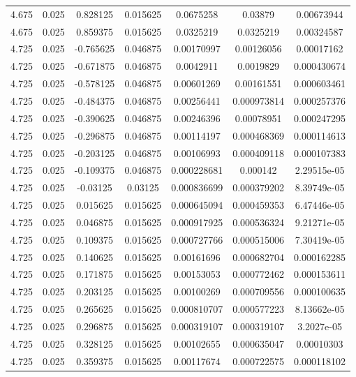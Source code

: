 \begin{table}[bh]
\begin{center}
{\begin{tabular}{ccccccc}
4.675	 & 0.025 & 	0.828125	 & 0.015625	 & 0.0675258	 & 0.03879	 & 0.00673944 \\ 
4.675	 & 0.025 & 	0.859375	 & 0.015625	 & 0.0325219	 & 0.0325219	 & 0.00324587 \\ 
4.725	 & 0.025 & 	-0.765625	 & 0.046875	 & 0.00170997	 & 0.00126056	 & 0.00017162 \\ 
4.725	 & 0.025 & 	-0.671875	 & 0.046875	 & 0.0042911	 & 0.0019829	 & 0.000430674 \\ 
4.725	 & 0.025 & 	-0.578125	 & 0.046875	 & 0.00601269	 & 0.00161551	 & 0.000603461 \\ 
4.725	 & 0.025 & 	-0.484375	 & 0.046875	 & 0.00256441	 & 0.000973814	 & 0.000257376 \\ 
4.725	 & 0.025 & 	-0.390625	 & 0.046875	 & 0.00246396	 & 0.00078951	 & 0.000247295 \\ 
4.725	 & 0.025 & 	-0.296875	 & 0.046875	 & 0.00114197	 & 0.000468369	 & 0.000114613 \\ 
4.725	 & 0.025 & 	-0.203125	 & 0.046875	 & 0.00106993	 & 0.000409118	 & 0.000107383 \\ 
4.725	 & 0.025 & 	-0.109375	 & 0.046875	 & 0.000228681	 & 0.000142	 & 2.29515e-05 \\ 
4.725	 & 0.025 & 	-0.03125	 & 0.03125	 & 0.000836699	 & 0.000379202	 & 8.39749e-05 \\ 
4.725	 & 0.025 & 	0.015625	 & 0.015625	 & 0.000645094	 & 0.000459353	 & 6.47446e-05 \\ 
4.725	 & 0.025 & 	0.046875	 & 0.015625	 & 0.000917925	 & 0.000536324	 & 9.21271e-05 \\ 
4.725	 & 0.025 & 	0.109375	 & 0.015625	 & 0.000727766	 & 0.000515006	 & 7.30419e-05 \\ 
4.725	 & 0.025 & 	0.140625	 & 0.015625	 & 0.00161696	 & 0.000682704	 & 0.000162285 \\ 
4.725	 & 0.025 & 	0.171875	 & 0.015625	 & 0.00153053	 & 0.000772462	 & 0.000153611 \\ 
4.725	 & 0.025 & 	0.203125	 & 0.015625	 & 0.00100269	 & 0.000709556	 & 0.000100635 \\ 
4.725	 & 0.025 & 	0.265625	 & 0.015625	 & 0.000810707	 & 0.000577223	 & 8.13662e-05 \\ 
4.725	 & 0.025 & 	0.296875	 & 0.015625	 & 0.000319107	 & 0.000319107	 & 3.2027e-05 \\ 
4.725	 & 0.025 & 	0.328125	 & 0.015625	 & 0.00102655	 & 0.000635047	 & 0.00010303 \\ 
4.725	 & 0.025 & 	0.359375	 & 0.015625	 & 0.00117674	 & 0.000722575	 & 0.000118102 \\ 

\end{tabular}}
\end{center}
\end{table}
